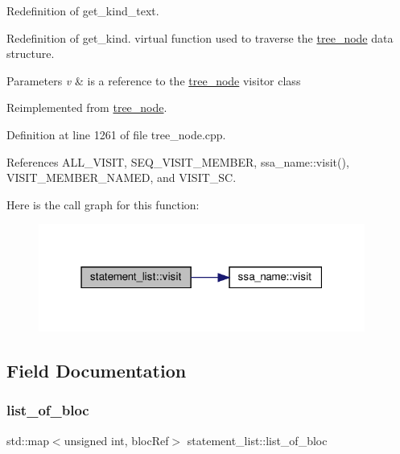 Redefinition of get\+\_\+kind\+\_\+text. 

Redefinition of get\+\_\+kind. virtual function used to traverse the \hyperlink{classtree__node}{tree\+\_\+node} data structure. 
\begin{DoxyParams}{Parameters}
{\em v} & is a reference to the \hyperlink{classtree__node}{tree\+\_\+node} visitor class \\
\hline
\end{DoxyParams}


Reimplemented from \hyperlink{classtree__node_aa9abba3f1b30e0be80b4a56b188c6ecc}{tree\+\_\+node}.



Definition at line 1261 of file tree\+\_\+node.\+cpp.



References A\+L\+L\+\_\+\+V\+I\+S\+IT, S\+E\+Q\+\_\+\+V\+I\+S\+I\+T\+\_\+\+M\+E\+M\+B\+ER, ssa\+\_\+name\+::visit(), V\+I\+S\+I\+T\+\_\+\+M\+E\+M\+B\+E\+R\+\_\+\+N\+A\+M\+ED, and V\+I\+S\+I\+T\+\_\+\+SC.

Here is the call graph for this function\+:
\nopagebreak
\begin{figure}[H]
\begin{center}
\leavevmode
\includegraphics[width=304pt]{d0/d9a/structstatement__list_a41991720aa29db82e76b6f28cd03fff3_cgraph}
\end{center}
\end{figure}


\subsection{Field Documentation}
\mbox{\label{structstatement__list_af54c307c1d5ccb43616915b912a916f0}} 
\subsubsection{\texorpdfstring{list\+\_\+of\+\_\+bloc}{list\_of\_bloc}}
{\footnotesize\ttfamily std\+::map$<$unsigned int, bloc\+Ref$>$ statement\+\_\+list\+::list\+\_\+of\+\_\+bloc}




